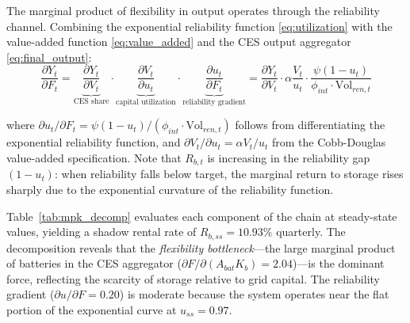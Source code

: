 \documentclass[12pt, a4paper]{article}
\begin{document}
The marginal product of flexibility in output operates through the reliability channel. Combining the exponential reliability function \eqref{eq:utilization} with the value-added function \eqref{eq:value_added} and the CES output aggregator \eqref{eq:final_output}:
\begin{equation}
\frac{\partial Y_t}{\partial F_t} = \underbrace{\frac{\partial Y_t}{\partial V_t}}_{\text{CES share}} \cdot \underbrace{\frac{\partial V_t}{\partial u_t}}_{\text{capital utilization}} \cdot \underbrace{\frac{\partial u_t}{\partial F_t}}_{\text{reliability gradient}} = \frac{\partial Y_t}{\partial V_t} \cdot \alpha \frac{V_t}{u_t} \cdot \frac{\psi (1 - u_t)}{\phi_{int} \cdot \text{Vol}_{ren,t}}
\label{eq:dY_dF}
\end{equation}

where $\partial u_t / \partial F_t = \psi(1-u_t)/(\phi_{int} \cdot \text{Vol}_{ren,t})$ follows from differentiating the exponential reliability function, and $\partial V_t / \partial u_t = \alpha V_t / u_t$ from the Cobb-Douglas value-added specification. Note that $R_{b,t}$ is increasing in the reliability gap $(1-u_t)$: when reliability falls below target, the marginal return to storage rises sharply due to the exponential curvature of the reliability function.

Table~\ref{tab:mpk_decomp} evaluates each component of the chain at steady-state values, yielding a shadow rental rate of $R_{b,ss} = 10.93\%$ quarterly. The decomposition reveals that the \textit{flexibility bottleneck}---the large marginal product of batteries in the CES aggregator ($\partial F / \partial(A_{bat} K_b) = 2.04$)---is the dominant force, reflecting the scarcity of storage relative to grid capital. The reliability gradient ($\partial u / \partial F = 0.20$) is moderate because the system operates near the flat portion of the exponential curve at $u_{ss} = 0.97$.
\end{document}
